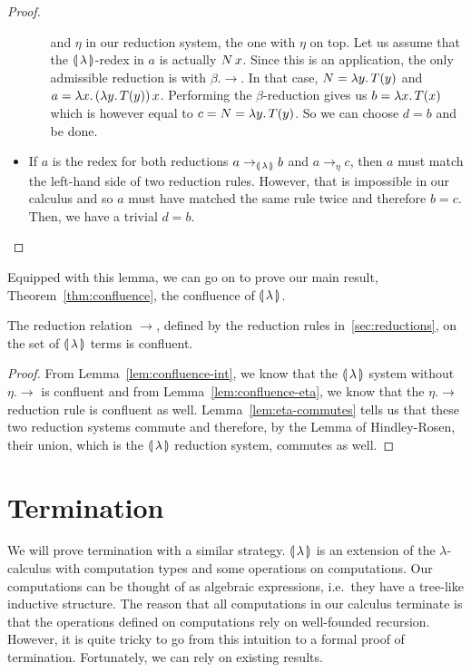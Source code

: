 \begin{proof}
\begin{itemize}
\begin{itemize}
      and $\eta$ in our reduction system, the one with $\eta$ on top. Let
      us assume that the $\llparenthesis \, \lambda \, \rrparenthesis$-redex in $a$ is actually
      $N\,x$. Since this is an application, the only admissible
      reduction is with $\beta.\to$. In that case, $N = \lambda y.\, T(y)$ and
      $a = \lambda x.\, (\lambda y.\, T(y))\,x$. Performing the
      $\beta$-reduction gives us $b = \lambda x.\, T(x)$ which is however equal
      to $c = N = \lambda y.\, T(y)$. So we can choose $d = b$ and be done.
    \end{itemize}
  \item If $a$ is the redex for both reductions $a \to_{\llparenthesis \, \lambda \, \rrparenthesis} b$ and
    $a \to_\eta c$, then $a$ must match the left-hand side of two reduction
    rules. However, that is impossible in our calculus and so $a$ must have
    matched the same rule twice and therefore $b = c$. Then, we have a
    trivial $d = b$.
  \end{itemize}
\end{proof}

Equipped with this lemma, we can go on to prove our main result,
Theorem~\ref{thm:confluence}, the confluence of $\llparenthesis \, \lambda \, \rrparenthesis$.

\begin{theorem}\label{thm:confluence}
  
  The reduction relation $\to$, defined by the reduction rules
  in~\ref{sec:reductions}, on the set of $\llparenthesis \, \lambda \, \rrparenthesis$ terms is
  confluent.
\end{theorem}

\begin{proof}
  From Lemma~\ref{lem:confluence-int}, we know that the $\llparenthesis \, \lambda \, \rrparenthesis$
  system without $\eta.\to$ is confluent and from
  Lemma~\ref{lem:confluence-eta}, we know that the $\eta.\to$ reduction
  rule is confluent as well. Lemma~\ref{lem:eta-commutes} tells us that
  these two reduction systems commute and therefore, by the Lemma of
  Hindley-Rosen, their union, which is the $\llparenthesis \, \lambda \, \rrparenthesis$ reduction
  system, commutes as well.
\end{proof}


\section{Termination}
\label{sec:termination}

We will prove termination with a similar strategy. $\llparenthesis \, \lambda \, \rrparenthesis$ is an
extension of the $\lambda$-calculus with computation types and some
operations on computations. Our computations can be thought of as algebraic
expressions, i.e.\ they have a tree-like inductive structure. The reason
that all computations in our calculus terminate is that the operations
defined on computations rely on well-founded recursion. However, it is
quite tricky to go from this intuition to a formal proof of
termination. Fortunately, we can rely on existing results.

